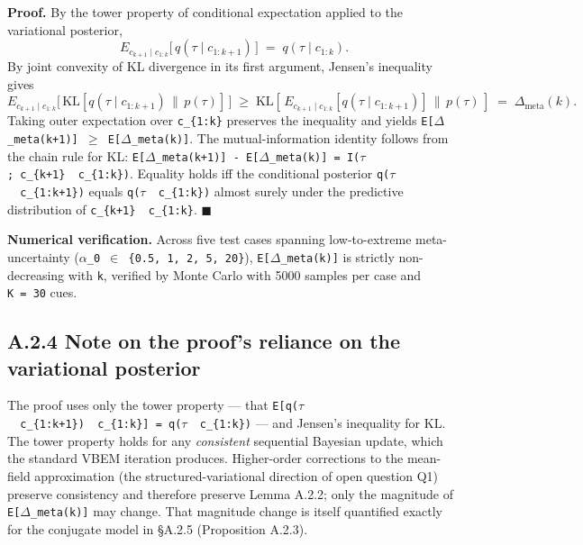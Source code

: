 \documentclass{article}
\begin{document}
\textbf{Proof.} By the tower property of conditional expectation applied
to the variational posterior, \[
E_{c_{k+1} \mid c_{1:k}}\big[\, q(\tau \mid c_{1:k+1}) \,\big] \;=\; q(\tau \mid c_{1:k}).
\] By joint convexity of KL divergence in its first argument, Jensen's
inequality gives \[
E_{c_{k+1} \mid c_{1:k}}\big[\, \mathrm{KL}[q(\tau \mid c_{1:k+1}) \,\|\, p(\tau)] \,\big]
\;\geq\;
\mathrm{KL}\!\left[\, E_{c_{k+1} \mid c_{1:k}}[q(\tau \mid c_{1:k+1})] \,\Big\|\, p(\tau) \,\right]
\;=\; \Delta_{\mathrm{meta}}(k).
\] Taking outer expectation over \texttt{c\_\{1:k\}} preserves the
inequality and yields
\texttt{E{[}\ensuremath{\Delta}\_meta(k+1){]}\ \ensuremath{\geq}\ E{[}\ensuremath{\Delta}\_meta(k){]}}. The
mutual-information identity follows from the chain rule for KL:
\texttt{E{[}\ensuremath{\Delta}\_meta(k+1){]}\ -\ E{[}\ensuremath{\Delta}\_meta(k){]}\ =\ I(\ensuremath{\tau};\ c\_\{k+1\}\ \textbar{}\ c\_\{1:k\})}.
Equality holds iff the conditional posterior
\texttt{q(\ensuremath{\tau}\ \textbar{}\ c\_\{1:k+1\})} equals
\texttt{q(\ensuremath{\tau}\ \textbar{}\ c\_\{1:k\})} almost surely under the predictive
distribution of \texttt{c\_\{k+1\}\ \textbar{}\ c\_\{1:k\}}. \ensuremath{\blacksquare}

\textbf{Numerical verification.} Across five test cases spanning
low-to-extreme meta-uncertainty
(\texttt{\ensuremath{\alpha}\_0\textquotesingle{}\ \ensuremath{\in}\ \{0.5,\ 1,\ 2,\ 5,\ 20\}}),
\texttt{E{[}\ensuremath{\Delta}\_meta(k){]}} is strictly non-decreasing with \texttt{k},
verified by Monte Carlo with 5000 samples per case and \texttt{K\ =\ 30}
cues.

\subsection{A.2.4 Note on the proof's reliance on the variational
posterior}\label{a.2.4-note-on-the-proofs-reliance-on-the-variational-posterior}

The proof uses only the tower property --- that
\texttt{E{[}q(\ensuremath{\tau}\ \textbar{}\ c\_\{1:k+1\})\ \textbar{}\ c\_\{1:k\}{]}\ =\ q(\ensuremath{\tau}\ \textbar{}\ c\_\{1:k\})}
--- and Jensen's inequality for KL. The tower property holds for any
\emph{consistent} sequential Bayesian update, which the standard VBEM
iteration produces. Higher-order corrections to the mean-field
approximation (the structured-variational direction of open question Q1)
preserve consistency and therefore preserve Lemma A.2.2; only the
magnitude of \texttt{E{[}\ensuremath{\Delta}\_meta(k){]}} may change. That magnitude
change is itself quantified exactly for the conjugate model in \S{}A.2.5
(Proposition A.2.3).
\end{document}
